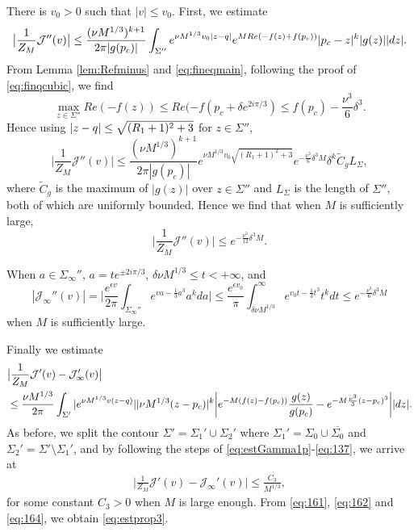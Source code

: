 \documentclass[11pt]{article}
\begin{document}
There is $v_0>0$ such that $|v|\le v_0$. First, we estimate
\begin{equation}
  \bigl| \frac1{Z_M} \mathcal{J}''(v) \bigr|
  \le \frac{(\nu M^{1/3})^{k+1}}{2\pi |g(p_c)|}
   \int_{\Sigma''} e^{\nu M^{1/3} v_0 |z-q|} e^{M Re(-f(z)+f(p_c))}
  |p_c-z|^k |g(z)| |dz|.
\end{equation}
From Lemma \ref{lem:Refminus} and \eqref{eq:fineqmain},
following the proof of \eqref{eq:finqcubic},
we find
\begin{equation}
  \max_{z\in \Sigma''} Re(-f(z))
  \le Re(-f(p_c+\delta e^{2i\pi/3})
  \le f(p_c)- \frac{\nu^3}6 \delta^3.
\end{equation}
Hence using $|z-q|\le \sqrt{(R_1+1)^2+3}$ for $z\in \Sigma''$,
\begin{equation}
  \bigl| \frac1{Z_M} \mathcal{J}''(v) \bigr|
  \le \frac{(\nu M^{1/3})^{k+1}}{2\pi |g(p_c)|}
  e^{\nu M^{1/3} v_0\sqrt{(R_1+1)^2+3}} e^{-\frac{\nu^3}6\delta^3M}
  \delta^k \widetilde{C}_g L_\Sigma,
\end{equation}
where $\widetilde{C}_g$ is the maximum of $|g(z)|$ over $z\in\Sigma''$
and $L_\Sigma$ is the length of $\Sigma''$, both of which are
uniformly bounded. Hence we find that when $M$ is sufficiently large,
\begin{equation}\label{eq:161}
  \bigl| \frac1{Z_M} \mathcal{J}''(v) \bigr|
  \le e^{-\frac{\nu^3}{12} \delta^3 M}.
\end{equation}


When $a\in \Sigma_\infty''$, $a= te^{\pm 2i\pi/3}$,
$\delta \nu M^{1/3} \le t<+\infty$, and
\begin{equation}\label{eq:162}
   | \mathcal{J}_\infty''(v)|
   = \biggl| \frac{e^{\epsilon v}}{2\pi}
\int_{\Sigma_\infty''} e^{va-\frac13a^3}a^k da   \biggr|
   \le \frac{e^{\epsilon v_0}}{\pi}  \int_{\delta \nu M^{1/3}}^\infty
e^{v_0t-\frac13 t^3} t^k dt
   \le e^{-\frac{\nu^3}{6}\delta^3 M}
\end{equation}
when $M$ is sufficiently large.

Finally we estimate
\begin{equation}
\begin{split}
  & \bigl| \frac1{Z_M} \mathcal{J}'(v) -\mathcal{J}_\infty'(v) \bigr| \\
&
\le \frac{\nu M^{1/3}}{2\pi} \int_{\Sigma'}
|e^{\nu M^{1/3} v(z-q)} | |\nu M^{1/3}(z- p_c)|^k
\biggl| e^{-M(f(z)-f(p_c))} \frac{g(z)}{g(p_c)} - e^{-M\frac{\nu^3}3(z-p_c)^3}
\biggr| |dz|.
\end{split}
\end{equation}
As before, we split the contour $\Sigma'=\Sigma_1'\cup\Sigma_2'$ where
$\Sigma_1'=\Sigma_0\cup\overline{\Sigma_0}$ and
$\Sigma_2'=\Sigma'\setminus\Sigma_1'$, and by following the steps
of \eqref{eq:estGamma1p}-\eqref{eq:137}, we arrive at
\begin{equation}\label{eq:164}
\begin{split}
  \bigl| \frac1{Z_M} \mathcal{J}'(v) -\mathcal{J}_\infty'(v) \bigr|
\le \frac{C_3}{M^{1/3}},
\end{split}
\end{equation}
for some constant $C_3>0$ when $M$ is large enough. From
\eqref{eq:161}, \eqref{eq:162} and \eqref{eq:164}, we obtain
\eqref{eq:estprop3}.
\end{document}

